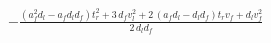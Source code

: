 $-\frac{{\left(a_f^{2} d_l - a_f d_l d_f\right)} t_r^{2} + 3 \, d_f v_l^{2} + 2 \, {\left(a_f d_l - d_l d_f\right)} t_r v_f + d_l v_f^{2}}{2 \, d_l d_f}$
